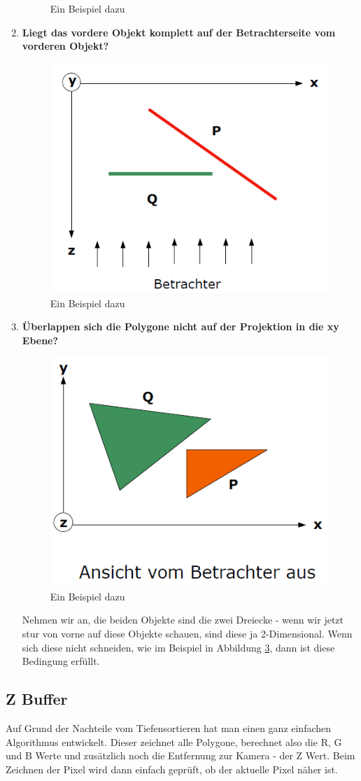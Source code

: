 \begin{enumerate}
\begin{figure}[!ht]
			\caption{Ein Beispiel dazu}
			\label{fig:tiefensortierung_3}
		\end{figure}
	\item \textbf{Liegt das vordere Objekt komplett auf der Betrachterseite vom vorderen Objekt?}\\
		\begin{figure}[!ht]
			\centering
			\includegraphics[width=0.5\linewidth]{fig/tiefensortierung_4}
			\caption{Ein Beispiel dazu}
			\label{fig:tiefensortierung_4}
		\end{figure}
	\item \textbf{Überlappen sich die Polygone nicht auf der Projektion in die xy Ebene?}\\
		\begin{figure}[!ht]
			\centering
			\includegraphics[width=0.5\linewidth]{fig/tiefensortierung_5}
			\caption{Ein Beispiel dazu}
			\label{fig:tiefensortierung_5}
		\end{figure}
	Nehmen wir an, die beiden Objekte sind die zwei Dreiecke - wenn wir jetzt stur von vorne auf diese Objekte schauen, sind diese ja 2-Dimensional. Wenn sich diese nicht schneiden, wie im Beispiel in Abbildung \ref{fig:tiefensortierung_5}, dann ist diese Bedingung erfüllt.
	
\end{enumerate}
\subsection{Z Buffer}
Auf Grund der Nachteile vom Tiefensortieren hat man einen ganz einfachen Algorithmus entwickelt. Dieser zeichnet alle Polygone, berechnet also die R, G und B Werte und zusätzlich noch die Entfernung zur Kamera - der Z Wert. Beim Zeichnen der Pixel wird dann einfach geprüft, ob der aktuelle Pixel näher ist.
